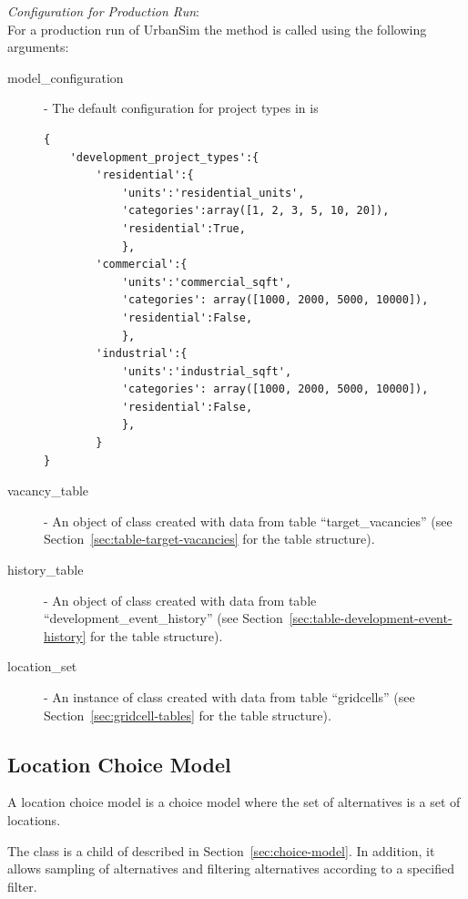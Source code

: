 {\em Configuration for Production Run}:\\[1mm]
For a production run of UrbanSim the method  is called using the
following arguments:
\begin{description}
\item[model_configuration] \modelsindex - The default configuration for project types in
   is \label{page:model-configuration}
\begin{verbatim}
{
    'development_project_types':{
        'residential':{
            'units':'residential_units',
            'categories':array([1, 2, 3, 5, 10, 20]),
            'residential':True,
            },
        'commercial':{
            'units':'commercial_sqft',
            'categories': array([1000, 2000, 5000, 10000]),
            'residential':False,
            },
        'industrial':{
            'units':'industrial_sqft',
            'categories': array([1000, 2000, 5000, 10000]),
            'residential':False,
            },
        }
}
\end{verbatim}
\item[vacancy_table] - An object of class  created
  with data from table ``target_vacancies'' (see
  Section~\ref{sec:table-target-vacancies} for the table structure).
\item[history_table] - An object of class  created
  with data from table ``development_event_history'' (see
  Section~\ref{sec:table-development-event-history} for the  table structure).
\item[location_set] - An instance of class  created with
  data from table ``gridcells'' (see Section~\ref{sec:gridcell-tables} for the
  table structure).
\end{description}



\subsection{Location Choice Model}
\label{sec:location-choice-model}
A location choice model \modelsindex is a choice model \modelsindex where the set of alternatives is a
set of locations.

The class  \modelsindex is a child of  \modelsindex
described in Section~\ref{sec:choice-model}. In addition, it allows sampling
of alternatives and filtering alternatives according to a specified filter.

